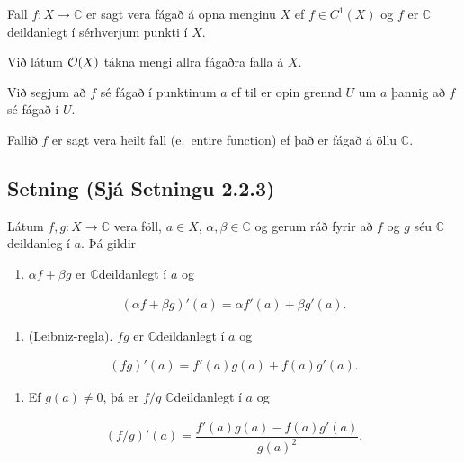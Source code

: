 \documentclass[a4paper,10pt,icelandic]{sphinxmanual}
\begin{document}
Fall \(f:X\to {\mathbb{C}}\) er sagt vera fágað á opna menginu \(X\) ef
\(f\in
C^1(X)\) og \(f\) er \({\mathbb{C}}\)\textendash{}deildanlegt í sérhverjum punkti í
\(X\).

Við látum \({\cal O}(X)\) tákna mengi allra fágaðra falla á \(X\).

Við segjum að \(f\) sé fágað í punktinum \(a\) ef til er opin
grennd \(U\) um \(a\) þannig að \(f\) sé fágað í \(U\).

Fallið \(f\) er sagt vera heilt fall (e. entire function) ef það er
fágað á öllu \({\mathbb{C}}\).


\subsection{Setning (Sjá Setningu 2.2.3)}
\label{\detokenize{Kafli02:setning-sja-setningu-2-2-3}}
Látum \(f,g:X\to {\mathbb{C}}\) vera föll,
\(a\in X\), \(\alpha,\beta\in {\mathbb{C}}\) og gerum ráð fyrir að
\(f\) og \(g\) séu \({\mathbb{C}}\)\textendash{}deildanleg í \(a\). Þá gildir
\begin{enumerate}
%
\item {} 
\(\alpha f+\beta g\) er \({\mathbb{C}}\)\textendash{}deildanlegt í \(a\) og

\end{enumerate}
\begin{equation*}
\begin{split}(\alpha f+\beta g)'(a)=\alpha f'(a)+\beta g'(a).\end{split}
\end{equation*}\begin{enumerate}
%
\setcounter{enumi}{1}
\item {} 
(Leibniz-regla). \(fg\) er \({\mathbb{C}}\)\textendash{}deildanlegt í \(a\) og

\end{enumerate}
\begin{equation*}
\begin{split}(fg)'(a)=f'(a)g(a)+f(a)g'(a).\end{split}
\end{equation*}\begin{enumerate}
%
\setcounter{enumi}{2}
\item {} 
Ef \(g(a)\neq 0\), þá er \(f/g\) \({\mathbb{C}}\)\textendash{}deildanlegt í \(a\) og

\end{enumerate}
\begin{equation*}
\begin{split}(f/g)'(a)=\dfrac{f'(a)g(a)-f(a)g'(a)}{g(a)^2}.\end{split}
\end{equation*}
\end{document}
